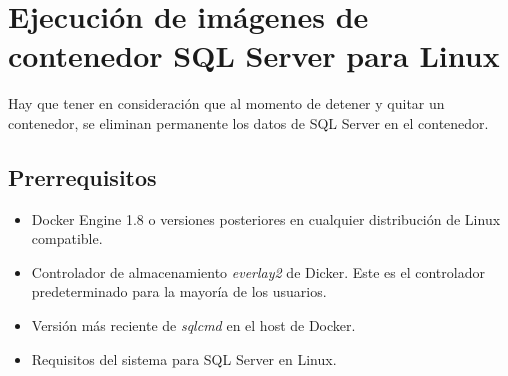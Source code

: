 \section{Ejecución de imágenes de contenedor SQL Server para Linux}
Hay que tener en consideración que al momento de detener y quitar un contenedor, se eliminan permanente los datos de SQL Server en el contenedor.

    \subsection{Prerrequisitos}
    \begin{itemize}
        \item Docker Engine 1.8 o versiones posteriores en cualquier distribución de Linux compatible.
        \item Controlador de almacenamiento \textit{everlay2} de Dicker. Este es el controlador predeterminado para la mayoría de los usuarios.
        \item Versión más reciente de \textit{sqlcmd} en el host de Docker.
        \item Requisitos del sistema para SQL Server en Linux.
    \end{itemize}

